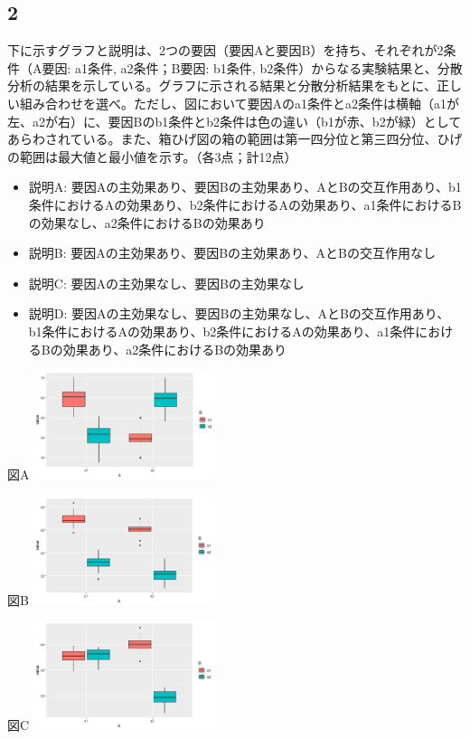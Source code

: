 \documentclass[
]{article}
\providecommand{\tightlist}{%
  \setlength{\itemsep}{0pt}\setlength{\parskip}{0pt}}
\begin{document}
\subsection{2}\label{section-1}

下に示すグラフと説明は、2つの要因（要因Aと要因B）を持ち、それぞれが2条件（A要因:
a1条件, a2条件；B要因: b1条件,
b2条件）からなる実験結果と、分散分析の結果を示している。グラフに示される結果と分散分析結果をもとに、正しい組み合わせを選べ。ただし、図において要因Aのa1条件とa2条件は横軸（a1が左、a2が右）に、要因Bのb1条件とb2条件は色の違い（b1が赤、b2が緑）としてあらわされている。また、箱ひげ図の箱の範囲は第一四分位と第三四分位、ひげの範囲は最大値と最小値を示す。（各3点；計12点）

\begin{itemize}
\tightlist
\item
  説明A:
  要因Aの主効果あり、要因Bの主効果あり、AとBの交互作用あり、b1条件におけるAの効果あり、b2条件におけるAの効果あり、a1条件におけるBの効果なし、a2条件におけるBの効果あり
\item
  説明B: 要因Aの主効果あり、要因Bの主効果あり、AとBの交互作用なし
\item
  説明C: 要因Aの主効果なし、要因Bの主効果なし
\item
  説明D:
  要因Aの主効果なし、要因Bの主効果なし、AとBの交互作用あり、b1条件におけるAの効果あり、b2条件におけるAの効果あり、a1条件におけるBの効果あり、a2条件におけるBの効果あり
\end{itemize}

図A
\includegraphics[width=0.4\textwidth,height=\textheight]{./q2figA.png}

図B
\includegraphics[width=0.4\textwidth,height=\textheight]{./q2figB.png}

図C
\includegraphics[width=0.4\textwidth,height=\textheight]{./q2figC.png}
\end{document}

